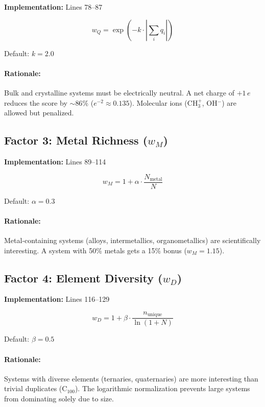 \documentclass[11pt]{article}
\begin{document}
\textbf{Implementation:} Lines 78--87

\begin{equation}
w_Q = \exp(-k \cdot |\sum_i q_i|)
\end{equation}

Default: $k = 2.0$

\paragraph{Rationale:} Bulk and crystalline systems must be electrically neutral. A net charge of $+1\,e$ reduces the score by $\sim 86\%$ ($e^{-2} \approx 0.135$). Molecular ions (CH$_3^+$, OH$^-$) are allowed but penalized.

\subsection{Factor 3: Metal Richness ($w_M$)}

\textbf{Implementation:} Lines 89--114

\begin{equation}
w_M = 1 + \alpha \cdot \frac{N_{\text{metal}}}{N}
\end{equation}

Default: $\alpha = 0.3$

\paragraph{Rationale:} Metal-containing systems (alloys, intermetallics, organometallics) are scientifically interesting. A system with 50\% metals gets a 15\% bonus ($w_M = 1.15$).

\subsection{Factor 4: Element Diversity ($w_D$)}

\textbf{Implementation:} Lines 116--129

\begin{equation}
w_D = 1 + \beta \cdot \frac{n_{\text{unique}}}{\ln(1 + N)}
\end{equation}

Default: $\beta = 0.5$

\paragraph{Rationale:} Systems with diverse elements (ternaries, quaternaries) are more interesting than trivial duplicates (C$_{100}$). The logarithmic normalization prevents large systems from dominating solely due to size.
\end{document}
